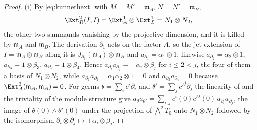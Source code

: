 \begin{proof}
(i) By \eqref{eq:kunnethext} with $M=M'=\mathfrak m_{A}$, $N=N'=\mathfrak m_{B}$,
\[
  \Ext^{2}_{R}(I,I)=\Ext^{1}_{A}\otimes\Ext^{1}_{B}=N_{1}\otimes N_{2},
\]
the other two summands vanishing by the projective dimension, and it is killed
by $\mathfrak m_{A}$ and $\mathfrak m_{B}$. The derivation $\partial_{1}$ acts on
the factor $A$, so the jet extension of $I=\mathfrak m_{A}\otimes\mathfrak m_{B}$
along it is $J_{\partial_{1}}(\mathfrak m_{A})\otimes\mathfrak m_{B}$ and
$a_{\partial_{1}}=\alpha_{1}\otimes1$; likewise $a_{\partial_{2}}=\alpha_{2}\otimes1$,
$a_{\partial_{3}}=1\otimes\beta_{3}$, $a_{\partial_{4}}=1\otimes\beta_{4}$.
Hence $a_{\partial_{i}}a_{\partial_{j}}=\pm\alpha_{i}\otimes\beta_{j}$ for
$i\le2<j$, the four of them a basis of $N_{1}\otimes N_{2}$, while
$a_{\partial_{1}}a_{\partial_{2}}=\alpha_{1}\alpha_{2}\otimes1=0$ and
$a_{\partial_{3}}a_{\partial_{4}}=0$ because $\Ext^{2}_{A}(\mathfrak m_{A},\mathfrak m_{A})=0$.
For germs $\theta=\sum_{i}c^{i}\partial_{i}$ and $\theta'=\sum_{j}c'^{j}\partial_{j}$
the linearity of  and the triviality of the module structure
give $a_{\theta}a_{\theta'}=\sum_{i,j}c^{i}(0)c'^{j}(0)\,a_{\partial_{i}}a_{\partial_{j}}$,
the image of $\theta(0)\wedge\theta'(0)$ under the projection of
$\bigwedge^{2}T_{0}$ onto $N_{1}\otimes N_{2}$ followed by the isomorphism
$\partial_{i}\otimes\partial_{j}\mapsto\pm\alpha_{i}\otimes\beta_{j}$.


\end{proof}
